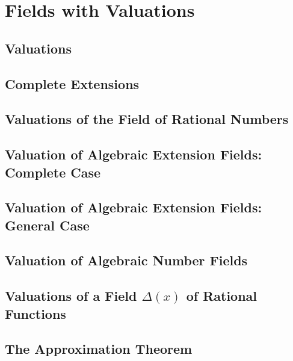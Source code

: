 \section{Fields with Valuations}

\subsection{Valuations}

\subsection{Complete Extensions}

\subsection{Valuations of the Field of Rational Numbers}

\subsection{Valuation of Algebraic Extension Fields: Complete Case}

\subsection{Valuation of Algebraic Extension Fields: General Case}

\subsection{Valuation of Algebraic Number Fields}

\subsection{Valuations of a Field $\Delta(x)$ of Rational Functions}

\subsection{The Approximation Theorem}